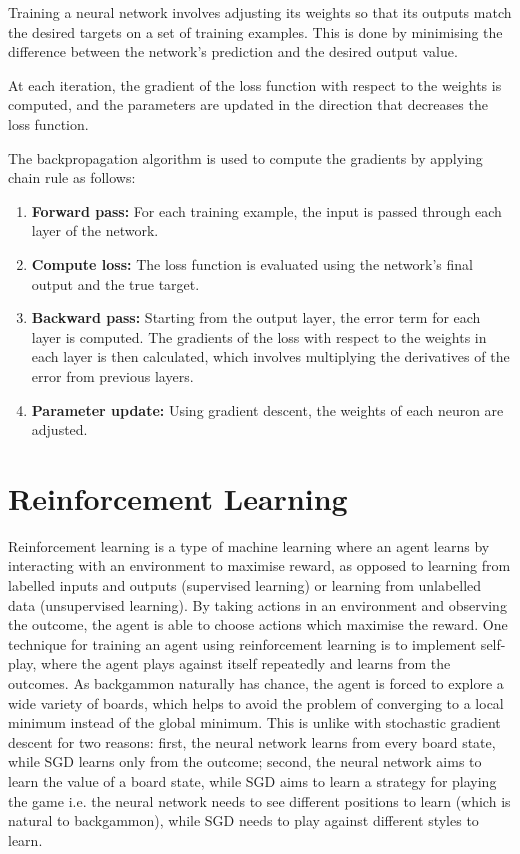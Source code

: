 Training a neural network involves adjusting its weights so that its outputs match the desired targets on a set of training examples. This is done by minimising the difference between the network's prediction and the desired output value.

At each iteration, the gradient of the loss function with respect to the weights is computed, and the parameters are updated in the direction that decreases the loss function.

 The backpropagation algorithm is used to compute the gradients by applying chain rule as follows:

\begin{enumerate}
  \item \textbf{Forward pass:} For each training example, the input is passed through each layer of the network.
  \item \textbf{Compute loss:} The loss function is evaluated using the network's final output and the true target.
  \item \textbf{Backward pass:} Starting from the output layer, the error term for each layer is computed. The gradients of the loss with respect to the weights in each layer is then calculated, which involves multiplying the derivatives of the error from previous layers. 
  \item \textbf{Parameter update:} Using gradient descent, the weights of each neuron are adjusted.
\end{enumerate}


\section{Reinforcement Learning}
Reinforcement learning is a type of machine learning where an agent learns by interacting with an environment to maximise reward, as opposed to learning from labelled inputs and outputs (supervised learning) or learning from unlabelled data (unsupervised learning). By taking actions in an environment and observing the outcome, the agent is able to choose actions which maximise the reward.  
One technique for training an agent using reinforcement learning is to implement self-play, where the agent plays against itself repeatedly and learns from the outcomes. 
As backgammon naturally has chance, the agent is forced to explore a wide variety of boards, which helps to avoid the problem of converging to a local minimum instead of the global minimum. 
This is unlike with stochastic gradient descent for two reasons: first, the neural network learns from every board state, while SGD learns only from the outcome; second, the neural network aims to learn the value of a board state, while SGD aims to learn a strategy for playing the game i.e. the neural network needs to see different positions to learn (which is natural to backgammon), while SGD needs to play against different styles to learn. 

